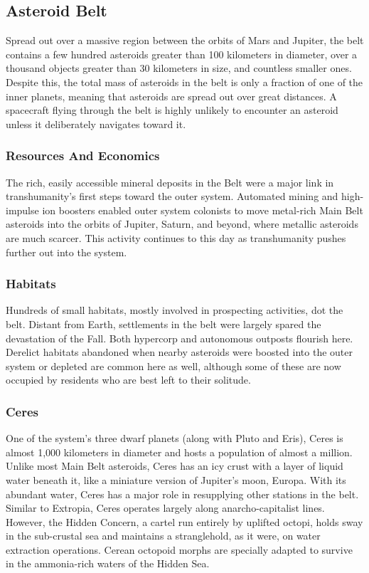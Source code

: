 \subsection{Asteroid Belt}

Spread out over a massive region between the orbits 
of Mars and Jupiter, the belt contains a few hundred 
asteroids greater than 100 kilometers in diameter, over 
a thousand objects greater than 30 kilometers in size, 
and countless smaller ones. Despite this, the total mass 
of asteroids in the belt is only a fraction of one of the 
inner planets, meaning that asteroids are spread out 
over great distances. A spacecraft flying through the 
belt is highly unlikely to encounter an asteroid unless 
it deliberately navigates toward it.

\subsubsection{Resources And Economics}

The rich, easily accessible mineral deposits in the 
Belt were a major link in transhumanity's first steps 
toward the outer system. Automated mining and 
high-impulse ion boosters enabled outer system 
colonists to move metal-rich Main Belt asteroids 
into the orbits of Jupiter, Saturn, and beyond, where 
metallic asteroids are much scarcer. This activity 
continues to this day as transhumanity pushes further
out into the system.

\subsubsection{Habitats}

Hundreds of small habitats, mostly involved in prospecting
activities, dot the belt. Distant from Earth,
settlements in the belt were largely spared the devastation
of the Fall. Both hypercorp and autonomous
outposts flourish here. Derelict habitats abandoned 
when nearby asteroids were boosted into the outer 
system or depleted are common here as well, although 
some of these are now occupied by residents who are 
best left to their solitude.

\subsubsection{Ceres}

One of the system's three dwarf planets (along with 
Pluto and Eris), Ceres is almost 1,000 kilometers in 
diameter and hosts a population of almost a million. 
Unlike most Main Belt asteroids, Ceres has an icy 
crust with a layer of liquid water beneath it, like a 
miniature version of Jupiter's moon, Europa. With 
its abundant water, Ceres has a major role in resupplying
other stations in the belt. Similar to Extropia,
Ceres operates largely along anarcho-capitalist lines. 
However, the Hidden Concern, a cartel run entirely 
by uplifted octopi, holds sway in the sub-crustal sea 
and maintains a stranglehold, as it were, on water 
extraction operations. Cerean octopoid morphs are 
specially adapted to survive in the ammonia-rich 
waters of the Hidden Sea.

